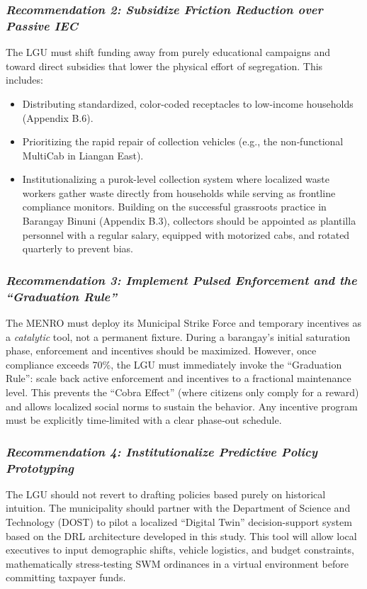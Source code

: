 \subsubsection*{\textit{Recommendation 2: Subsidize Friction Reduction over Passive IEC}}
The LGU must shift funding away from purely educational campaigns and toward direct subsidies that lower the physical effort of segregation. This includes:
\begin{itemize}
    \item Distributing standardized, color-coded receptacles to low-income households (Appendix B.6).
    \item Prioritizing the rapid repair of collection vehicles (e.g., the non‑functional MultiCab in Liangan East).
    \item Institutionalizing a purok-level collection system where localized waste workers gather waste directly from households while serving as frontline compliance monitors. Building on the successful grassroots practice in Barangay Binuni (Appendix B.3), collectors should be appointed as plantilla personnel with a regular salary, equipped with motorized cabs, and rotated quarterly to prevent bias.
\end{itemize}

\subsubsection*{\textit{Recommendation 3: Implement Pulsed Enforcement and the “Graduation Rule”}}
The MENRO must deploy its Municipal Strike Force and temporary incentives as a \textit{catalytic} tool, not a permanent fixture. During a barangay’s initial saturation phase, enforcement and incentives should be maximized. However, once compliance exceeds 70\%, the LGU must immediately invoke the “Graduation Rule”: scale back active enforcement and incentives to a fractional maintenance level. This prevents the “Cobra Effect” (where citizens only comply for a reward) and allows localized social norms to sustain the behavior. Any incentive program must be explicitly time‑limited with a clear phase‑out schedule.

\subsubsection*{\textit{Recommendation 4: Institutionalize Predictive Policy Prototyping}}
The LGU should not revert to drafting policies based purely on historical intuition. The municipality should partner with the Department of Science and Technology (DOST) to pilot a localized “Digital Twin” decision-support system based on the DRL architecture developed in this study. This tool will allow local executives to input demographic shifts, vehicle logistics, and budget constraints, mathematically stress‑testing SWM ordinances in a virtual environment before committing taxpayer funds.

